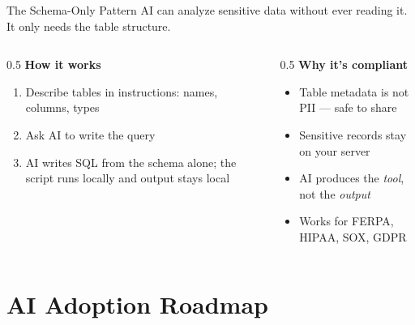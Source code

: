 \documentclass[aspectratio=169]{beamer}
\begin{document}
\begin{frame}{The Schema-Only Pattern}
AI can analyze sensitive data \alert{without ever reading it}. It only needs the table structure.
\vspace{0.3cm}
\begin{columns}[T]
\begin{column}{0.5\textwidth}
\textbf{How it works}
\begin{enumerate}\small
  \item Describe tables in instructions: names, columns, types
  \item Ask AI to write the query
  \item AI writes SQL from the schema alone; the script runs locally and output stays local
\end{enumerate}
\end{column}
\begin{column}{0.5\textwidth}
\textbf{Why it's compliant}
\begin{itemize}\small
  \item Table metadata is \alert{not PII} --- safe to share
  \item Sensitive records stay on your server
  \item AI produces the \textit{tool}, not the \textit{output}
  \item Works for FERPA, HIPAA, SOX, GDPR
\end{itemize}
\end{column}
\end{columns}
\end{frame}

\section{AI Adoption Roadmap}
\end{document}
